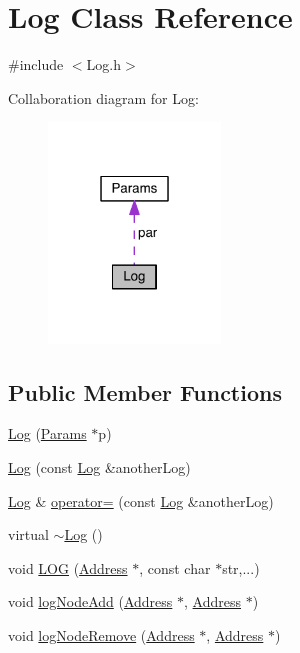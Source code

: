 \hypertarget{class_log}{}\section{Log Class Reference}
\label{class_log}


{\ttfamily \#include $<$Log.\+h$>$}



Collaboration diagram for Log\+:\nopagebreak
\begin{figure}[H]
\begin{center}
\leavevmode
\includegraphics[width=130pt]{d8/d07/class_log__coll__graph}
\end{center}
\end{figure}
\subsection*{Public Member Functions}
\begin{DoxyCompactItemize}
\item 
\hyperlink{class_log_aa688df18833d2692f2fe2bad29c6bb0b}{Log} (\hyperlink{class_params}{Params} $\ast$p)
\item 
\hyperlink{class_log_a916b0ff8710edcf0cb98748289e3db17}{Log} (const \hyperlink{class_log}{Log} \&another\+Log)
\item 
\hyperlink{class_log}{Log} \& \hyperlink{class_log_a6cdf3d55a6145e372e216f228c168638}{operator=} (const \hyperlink{class_log}{Log} \&another\+Log)
\item 
virtual \hyperlink{class_log_a0fbfda88fbee5027c89f6eb121059360}{$\sim$\+Log} ()
\item 
void \hyperlink{class_log_a92329c48f5a27043e24f1748bc7292e4}{L\+O\+G} (\hyperlink{class_address}{Address} $\ast$, const char $\ast$str,...)
\item 
void \hyperlink{class_log_a42c2ceae15f1b56cce04354b80a49ecb}{log\+Node\+Add} (\hyperlink{class_address}{Address} $\ast$, \hyperlink{class_address}{Address} $\ast$)
\item 
void \hyperlink{class_log_afc655d245c4b755488b8a8a371a1d6b9}{log\+Node\+Remove} (\hyperlink{class_address}{Address} $\ast$, \hyperlink{class_address}{Address} $\ast$)
\end{DoxyCompactItemize}

